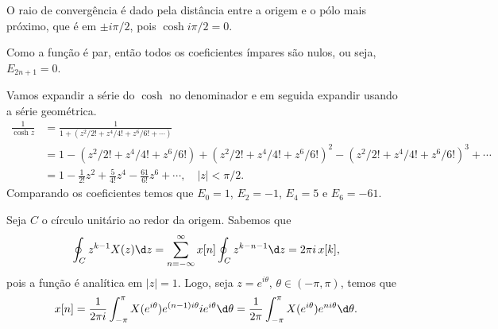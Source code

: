 
\begin{questions}

\setcounter{question}{2}
%
\begin{solution}
    O raio de convergência é dado pela distância entre a origem e o pólo mais próximo, que é em $\pm i\pi/2$, pois $\cosh i\pi/2 = 0$.
    
    Como a função é par, então todos os coeficientes ímpares são nulos, ou seja, $E_{2n+1} = 0$.
    
    Vamos expandir a série do $\cosh$ no denominador e em seguida expandir usando a série geométrica.
    \begin{align*}
        \frac{1}{\cosh z} &= \frac{1}{1 + (z^2/2! + z^4/4! + z^6/6! + \cdots)}\\
            &= 1 - (z^2/2! + z^4/4! + z^6/6!) + (z^2/2! + z^4/4! + z^6/6!)^2 - (z^2/2! + z^4/4! + z^6/6!)^3 + \cdots\\
            &= 1 - \frac{1}{2!}z^2 + \frac{5}{4!}z^4 - \frac{61}{6!}z^6 + \cdots, \quad |z| < \pi/2.
    \end{align*}
    Comparando os coeficientes temos que $E_0 = 1$, $E_2 = -1$, $E_4 = 5$ e $E_6 = -61$.
\end{solution}

\begin{solution}
    Seja $C$ o círculo unitário ao redor da origem. Sabemos que
    \begin{align*}
        \oint_C z^{k-1} X(z) \d z = \sum_{n = -\infty}^\infty x[n] \oint_C z^{k-n-1} \d z = 2\pi i \, x[k],
    \end{align*}
    pois a função é analítica em $|z|=1$.
    Logo, seja $z = e^{i\theta}$, $\theta\in(-\pi,\pi)$, temos que
    \begin{align*}
        x[n] = \frac{1}{2\pi i} \int_{-\pi}^{\pi} X(e^{i\theta}) e^{(n-1)i\theta} i e^{i\theta} \d\theta
            = \frac{1}{2\pi} \int_{-\pi}^{\pi} X(e^{i\theta}) e^{ni\theta}\d\theta.
    \end{align*}
\end{solution}


\end{questions}
